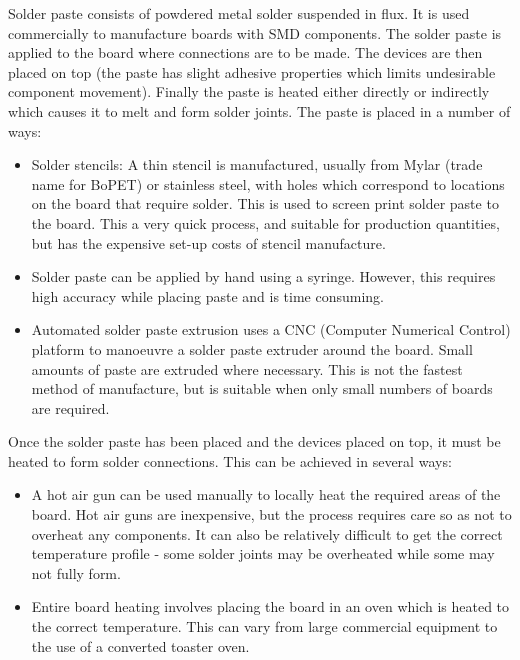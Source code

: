 Solder paste consists of powdered metal solder suspended in flux. It is used commercially to manufacture boards with SMD components. The solder paste is applied to the board where
connections are to be made. The devices are then placed on top (the paste has slight adhesive properties which limits undesirable component movement). Finally the paste is heated either directly
or indirectly which causes it to melt and form solder joints. The paste is placed in a number of ways:

\begin{itemize}
			\item	Solder stencils: A thin stencil is manufactured, usually from Mylar (trade name for BoPET) or stainless steel, with holes which correspond to locations on the board that require solder.
					This is used to screen print solder paste to the board.
					This a very quick process, and suitable for production quantities, but has the expensive set-up costs of stencil manufacture.
			\item	Solder paste can be applied by hand using a syringe. However, this requires high accuracy while placing paste and is time consuming.
			\item	Automated solder paste extrusion uses a CNC (Computer Numerical Control) platform to manoeuvre a solder paste extruder around the board. Small amounts of paste
					are extruded where necessary. This is not the fastest method of manufacture, but is suitable when only small numbers of boards are required.
\end{itemize}

Once the solder paste has been placed and the devices placed on top, it must be heated to form solder connections. This can be achieved in several ways:

\begin{itemize}
			\item	A hot air gun can be used manually to locally heat the required areas of the board. Hot air guns are inexpensive, but the process requires care so as not to overheat any
					components. It can also be relatively difficult to get the correct temperature profile - some solder joints may be overheated while some may not fully form.
			\item	Entire board heating involves placing the board in an oven which is heated to the correct temperature. This can vary from large commercial equipment to the use of a
					converted toaster oven.
\end{itemize}
			
